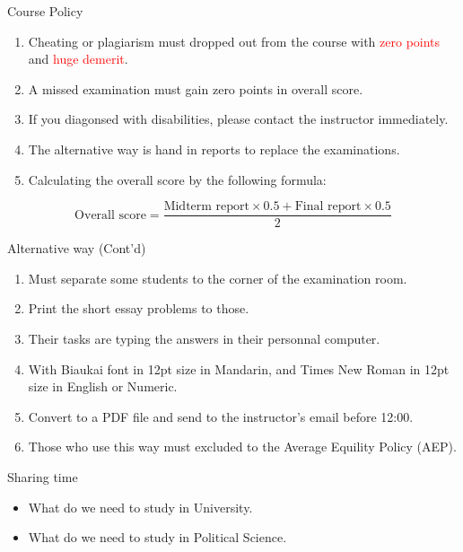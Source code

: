 \documentclass{beamer}
\begin{document}
\begin{frame}{Course Policy}
\begin{enumerate}
\item Cheating or plagiarism must dropped out from the course with \textcolor{red}{zero points} and \textcolor{red}{huge demerit}. \\
\item A missed examination must gain zero points in overall score. \\
\item If you diagonsed with disabilities, please contact the instructor immediately. \\
\item The alternative way is hand in reports to replace the examinations. \\
\item Calculating the overall score by the following formula: \\
\end{enumerate}
\begin{equation*}
\text{Overall score} = \frac{\text{Midterm report} \times 0.5 + \text{Final report} \times 0.5}{2}
\end{equation*}
\end{frame}
\begin{frame}{Alternative way (Cont'd)}
\begin{enumerate}
\item Must separate some students to the corner of the examination room. \\
\item Print the short essay problems to those. \\  
\item Their tasks are typing the answers in their personnal computer. \\
\item With Biaukai font in 12pt size in Mandarin, and Times New Roman in 12pt size in English or Numeric. \\
\item Convert to a PDF file and send to the instructor's email before 12:00. \\
\item Those who use this way must excluded to the Average Equility Policy (AEP). \\
\end{enumerate}
\end{frame}
\begin{frame}{Sharing time}
\begin{itemize}
\item What do we need to study in University.
\item What do we need to study in Political Science.
\end{itemize}
\end{frame}
\end{document}

